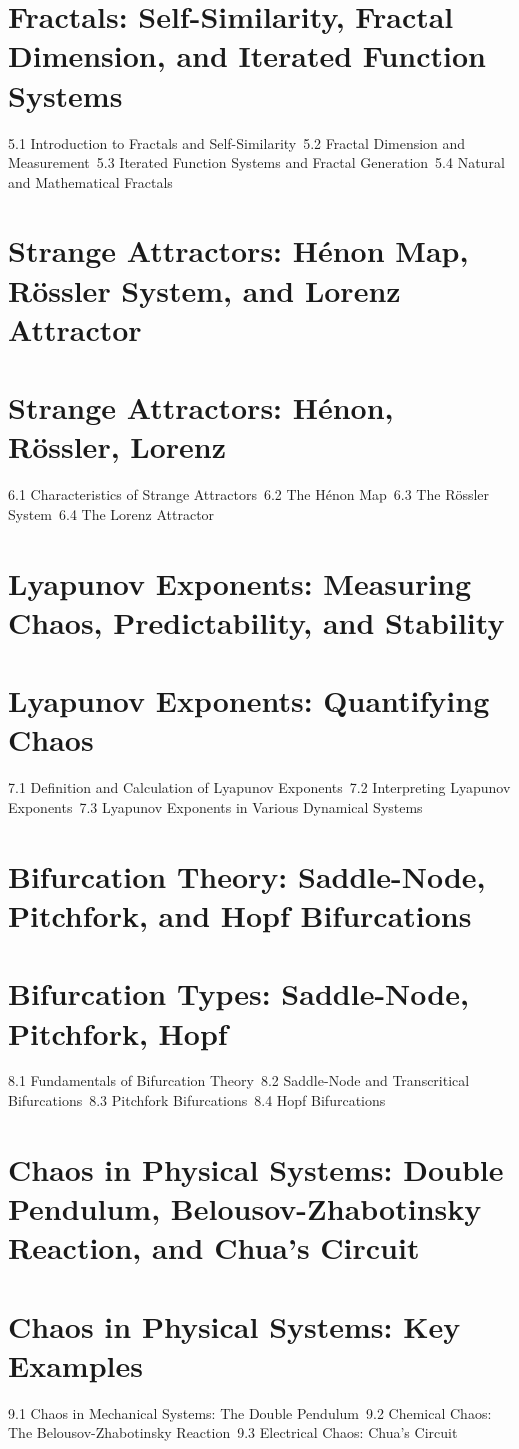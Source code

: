 \section{Fractals: Self-Similarity, Fractal Dimension, and Iterated Function Systems}
5.1 Introduction to Fractals and Self-Similarity\
5.2 Fractal Dimension and Measurement\
5.3 Iterated Function Systems and Fractal Generation\
5.4 Natural and Mathematical Fractals\
\section{Strange Attractors: Hénon Map, Rössler System, and Lorenz Attractor}
\section{Strange Attractors: Hénon, Rössler, Lorenz}
6.1 Characteristics of Strange Attractors\
6.2 The Hénon Map\
6.3 The Rössler System\
6.4 The Lorenz Attractor\
\section{Lyapunov Exponents: Measuring Chaos, Predictability, and Stability}
\section{Lyapunov Exponents: Quantifying Chaos}
7.1 Definition and Calculation of Lyapunov Exponents\
7.2 Interpreting Lyapunov Exponents\
7.3 Lyapunov Exponents in Various Dynamical Systems\
\section{Bifurcation Theory: Saddle-Node, Pitchfork, and Hopf Bifurcations}
\section{Bifurcation Types: Saddle-Node, Pitchfork, Hopf}
8.1 Fundamentals of Bifurcation Theory\
8.2 Saddle-Node and Transcritical Bifurcations\
8.3 Pitchfork Bifurcations\
8.4 Hopf Bifurcations\
\section{Chaos in Physical Systems: Double Pendulum, Belousov-Zhabotinsky Reaction, and Chua's Circuit}
\section{Chaos in Physical Systems: Key Examples}
9.1 Chaos in Mechanical Systems: The Double Pendulum\
9.2 Chemical Chaos: The Belousov-Zhabotinsky Reaction\
9.3 Electrical Chaos: Chua's Circuit\
